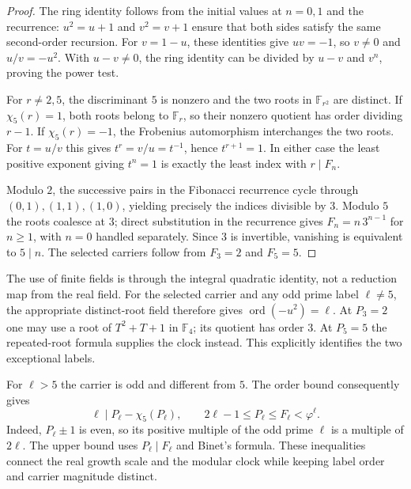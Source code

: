 \documentclass[11pt]{article}
\theoremstyle{definition}
\begin{document}
\begin{proof}
The ring identity follows from the initial values at $n=0,1$
and the recurrence: $u^2=u+1$ and $v^2=v+1$ ensure that both
sides satisfy the same second-order recursion.
For $v=1-u$, these identities give $uv=-1$, so $v\ne0$
and $u/v=-u^2$. With $u-v\ne0$, the ring identity can be
divided by $u-v$ and $v^n$, proving the power test.

For $r\ne2,5$, the discriminant $5$ is nonzero and the two roots
in $\mathbb F_{r^2}$ are distinct. If $\chi_5(r)=1$, both roots
belong to $\mathbb F_r$, so their nonzero quotient has order
dividing $r-1$. If $\chi_5(r)=-1$, the Frobenius automorphism
interchanges the two roots. For $t=u/v$ this gives
$t^r=v/u=t^{-1}$, hence $t^{r+1}=1$.
In either case the least positive exponent giving $t^n=1$
is exactly the least index with $r\mid F_n$.

Modulo $2$, the successive pairs in the Fibonacci recurrence
cycle through $(0,1),(1,1),(1,0)$, yielding precisely the indices
divisible by $3$. Modulo $5$ the roots coalesce at $3$; direct
substitution in the recurrence gives
$F_n=n\,3^{n-1}$ for $n\ge1$, with $n=0$ handled separately.
Since $3$ is invertible, vanishing is equivalent to $5\mid n$.
The selected carriers follow from $F_3=2$ and $F_5=5$.
\end{proof}

The use of finite fields is through the integral quadratic
identity, not a reduction map from the real field.
For the selected carrier and any odd prime label $\ell\ne5$,
the appropriate distinct-root field therefore gives
$\operatorname{ord}(-u^2)=\ell$.
At $P_3=2$ one may use a root of $T^2+T+1$ in $\mathbb F_4$;
its quotient has order $3$.
At $P_5=5$ the repeated-root formula supplies the clock instead.
This explicitly identifies the two exceptional labels.

For $\ell>5$ the carrier is odd and different from $5$.
The order bound consequently gives
\[
 \ell\mid P_\ell-\chi_5(P_\ell),\qquad
 2\ell-1\le P_\ell\le F_\ell<\varphi^\ell.
\]
Indeed, $P_\ell\pm1$ is even, so its positive multiple of the
odd prime $\ell$ is a multiple of $2\ell$.
The upper bound uses $P_\ell\mid F_\ell$ and Binet's formula.
These inequalities connect the real growth scale and the modular
clock while keeping label order and carrier magnitude distinct.
\end{document}
